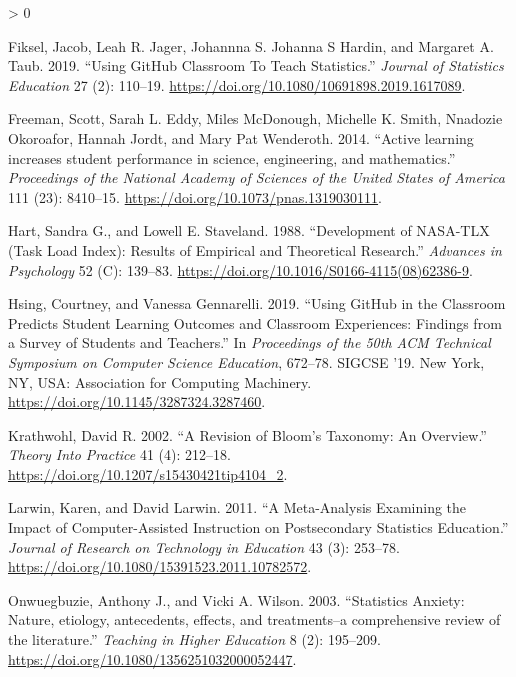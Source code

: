 \documentclass[
]{article}
\newlength{\cslhangindent}
\newenvironment{CSLReferences}[2] %
 {%
  \setlength{\parindent}{0pt}
  \ifodd #1 \everypar{\setlength{\hangindent}{\cslhangindent}}\ignorespaces\fi
  \ifnum #2 > 0
  \setlength{\parskip}{#2\baselineskip}
  \fi
 }%
 {}
\begin{document}
\begin{CSLReferences}{1}{0}
\leavevmode\hypertarget{ref-Fiksel2019}{}%
Fiksel, Jacob, Leah R. Jager, Johannna S. Johanna S Hardin, and Margaret
A. Taub. 2019. {``{Using GitHub Classroom To Teach Statistics}.''}
\emph{Journal of Statistics Education} 27 (2): 110--19.
\url{https://doi.org/10.1080/10691898.2019.1617089}.

\leavevmode\hypertarget{ref-Freeman2014}{}%
Freeman, Scott, Sarah L. Eddy, Miles McDonough, Michelle K. Smith,
Nnadozie Okoroafor, Hannah Jordt, and Mary Pat Wenderoth. 2014.
{``{Active learning increases student performance in science,
engineering, and mathematics}.''} \emph{Proceedings of the National
Academy of Sciences of the United States of America} 111 (23): 8410--15.
\url{https://doi.org/10.1073/pnas.1319030111}.

\leavevmode\hypertarget{ref-Hart1988}{}%
Hart, Sandra G., and Lowell E. Staveland. 1988. {``{Development of
NASA-TLX (Task Load Index): Results of Empirical and Theoretical
Research}.''} \emph{Advances in Psychology} 52 (C): 139--83.
\url{https://doi.org/10.1016/S0166-4115(08)62386-9}.

\leavevmode\hypertarget{ref-Hsing2019}{}%
Hsing, Courtney, and Vanessa Gennarelli. 2019. {``{Using GitHub in the
Classroom Predicts Student Learning Outcomes and Classroom Experiences:
Findings from a Survey of Students and Teachers}.''} In
\emph{Proceedings of the 50th ACM Technical Symposium on Computer
Science Education}, 672--78. SIGCSE '19. New York, NY, USA: Association
for Computing Machinery. \url{https://doi.org/10.1145/3287324.3287460}.

\leavevmode\hypertarget{ref-Krathwohl2002}{}%
Krathwohl, David R. 2002. {``{A Revision of Bloom's Taxonomy: An
Overview}.''} \emph{Theory Into Practice} 41 (4): 212--18.
\url{https://doi.org/10.1207/s15430421tip4104_2}.

\leavevmode\hypertarget{ref-Larwin2011}{}%
Larwin, Karen, and David Larwin. 2011. {``{A Meta-Analysis Examining the
Impact of Computer-Assisted Instruction on Postsecondary Statistics
Education}.''} \emph{Journal of Research on Technology in Education} 43
(3): 253--78. \url{https://doi.org/10.1080/15391523.2011.10782572}.

\leavevmode\hypertarget{ref-Onwuegbuzie2003}{}%
Onwuegbuzie, Anthony J., and Vicki A. Wilson. 2003. {``{Statistics
Anxiety: Nature, etiology, antecedents, effects, and treatments--a
comprehensive review of the literature}.''} \emph{Teaching in Higher
Education} 8 (2): 195--209.
\url{https://doi.org/10.1080/1356251032000052447}.

\end{CSLReferences}
\end{document}
